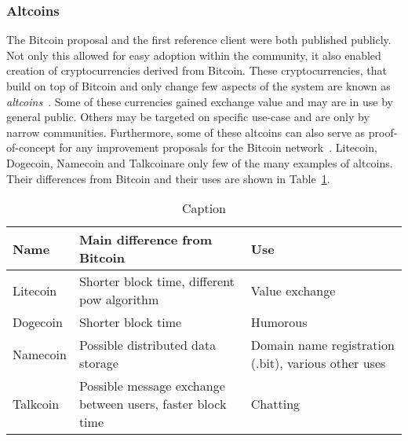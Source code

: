 \subsubsection{Altcoins}
The Bitcoin proposal and the first reference client were both published publicly. Not only this allowed for easy adoption within the community, it also enabled creation of cryptocurrencies derived from Bitcoin. These cryptocurrencies, that build on top of Bitcoin and only change few aspects of the system are known as \textit{altcoins}~\cite{Judmayer2017BlocksMechanisms}. Some of these currencies gained exchange value and may are in use by general public. Others may be targeted on specific use-case and are only by narrow communities. Furthermore, some of these altcoins can also serve as proof-of-concept for any improvement proposals for the Bitcoin network~\cite{Tarasiewicz2015ChapterExperiments}. Litecoin, Dogecoin, Namecoin and Talkcoin\footnotemark are only few of the many examples of altcoins. Their differences from Bitcoin and their uses are shown in Table~\ref{tab:altcoins}.
% 
% 
\begin{table}[ht]
    \centering
    \begin{tabularx}{\textwidth}{|l|X|m{10em}|}
         \hline
         \textbf{Name}&\textbf{Main difference from Bitcoin}&\textbf{Use}\\
         \hline
         \hline
         Litecoin&Shorter block time, different \acrshort{pow} algorithm&Value exchange\\
         \hline
         Dogecoin&Shorter block time&Humorous\\
         \hline
         Namecoin&Possible distributed data storage&Domain name registration (.bit), various other uses\\
         \hline
         Talkcoin&Possible message exchange between users, faster block time&Chatting\\
         \hline 
    \end{tabularx}
    \caption{Caption}
    \label{tab:altcoins}
\end{table}